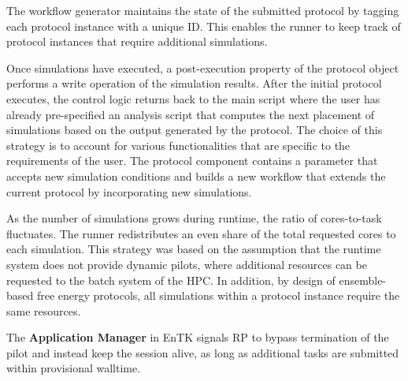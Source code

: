 
The workflow generator maintains the state of the submitted protocol by tagging 
each protocol instance with a unique ID. This enables the runner to keep track 
of protocol instances that require additional simulations. 

Once simulations have executed, a post-execution property of the protocol object
performs a write operation of the simulation results. After the initial protocol 
executes, the control logic returns back to the main script where the user has 
already pre-specified an analysis script that computes the next placement of 
simulations based on the output generated by the protocol. The choice of this 
strategy is to account for various functionalities that are specific to the 
requirements of the user. The protocol component contains a parameter that 
accepts new simulation conditions and builds a new workflow that extends the 
current protocol by incorporating new simulations.

As the number of simulations grows during runtime, the ratio of cores-to-task 
fluctuates. The runner redistributes an even share of the total requested cores 
to each simulation. This strategy was based on the assumption that the runtime 
system does not provide dynamic pilots, where additional resources can be 
requested to the batch system of the HPC. In addition, by design of 
ensemble-based free energy protocols, all simulations within a protocol instance
require the same resources. 

The \textbf{Application Manager} in EnTK signals RP to 
bypass termination of the pilot and instead keep the session alive, as long as 
additional tasks are submitted within provisional walltime. 




